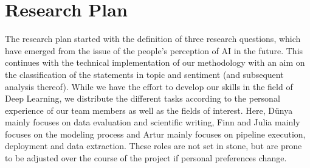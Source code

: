 \documentclass{article}
\begin{document}
\section{Research Plan}
The research plan started with the definition of three research questions, which have emerged from the issue of the people’s perception of AI in the future.
This continues with the technical implementation of our methodology with an aim on the classification of the statements in topic and sentiment (and subsequent analysis thereof).
While we have the effort to develop our skills in the field of Deep Learning, we distribute the different tasks according to the personal experience of our team members as well as the fields of interest.
Here, Dünya mainly focuses on data evaluation and scientific writing, Finn and Julia mainly focuses on the modeling process and Artur  mainly focuses on pipeline execution, deployment and data extraction.
These roles are not set in stone, but are prone to be adjusted over the course of the project if personal preferences change.
\end{document}
